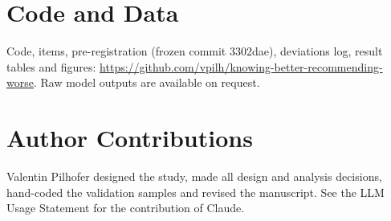 \documentclass[11pt,a4paper]{article}
\begin{document}
\section*{Code and Data}

Code, items, pre-registration (frozen commit 3302dae), deviations log, result tables and figures:
\url{https://github.com/vpilh/knowing-better-recommending-worse}. Raw model outputs are available on
request.

\section*{Author Contributions}

Valentin Pilhofer designed the study, made all design and analysis decisions, hand-coded the
validation samples and revised the manuscript. See the LLM Usage Statement for the contribution of
Claude.
\end{document}
